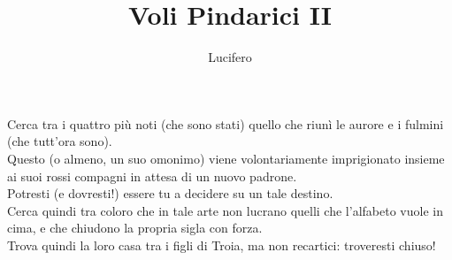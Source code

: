 \documentclass[12pt]{article}
\title{Voli Pindarici II}
\author{Lucifero}
\date{}
\begin{document}
\maketitle
\thispagestyle{empty}
\begin{center}
Cerca tra i quattro più noti (che sono stati) quello che riunì le aurore e i fulmini (che tutt'ora sono).\\
Questo (o almeno, un suo omonimo) viene volontariamente imprigionato insieme ai suoi rossi compagni in attesa di un nuovo padrone.\\
Potresti (e dovresti!) essere tu a decidere su un tale destino.\\
Cerca quindi tra coloro che in tale arte non lucrano quelli che l'alfabeto vuole in cima, e che chiudono la propria sigla con forza.\\
Trova quindi la loro casa tra i figli di Troia, ma non recartici: troveresti chiuso!\\

\end{center}
\end{document}
